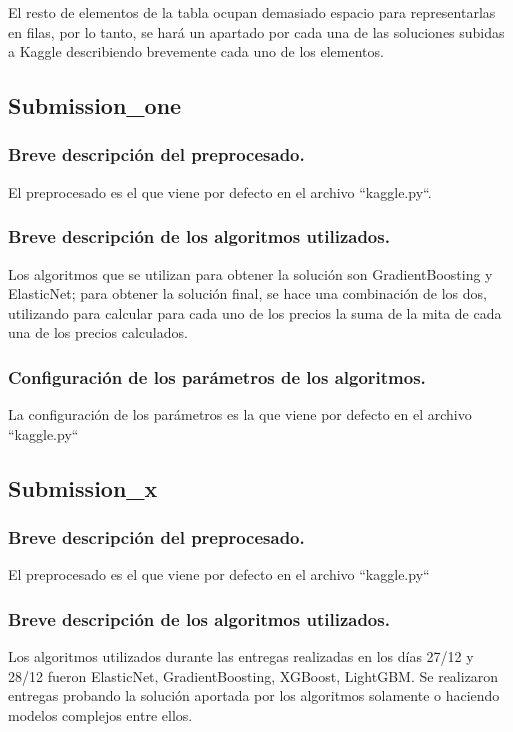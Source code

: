 	\vspace{0.06in}

	El resto de elementos de la tabla ocupan demasiado espacio para representarlas en filas, por lo tanto, se hará un apartado por cada una de las soluciones subidas a Kaggle describiendo brevemente cada uno de los elementos.
	
	\vspace{0.06in}
	
	\subsection{Submission\_one}
	\subsubsection{Breve descripción del preprocesado.}
	El preprocesado es el que viene por defecto en el archivo ``kaggle.py``.
	\subsubsection{Breve descripción de los algoritmos utilizados.}
	Los algoritmos que se utilizan para obtener la solución son GradientBoosting y ElasticNet; para obtener la solución final, se hace una combinación de los dos, utilizando para calcular para cada uno de los precios la suma de la mita de cada una de los precios calculados.
	\subsubsection{Configuración de los parámetros de los algoritmos.}
	La configuración de los parámetros es la que viene por defecto en el archivo ``kaggle.py``
	
	\subsection{Submission\_x}
	\subsubsection{Breve descripción del preprocesado.}
	El preprocesado es el que viene por defecto en el archivo ``kaggle.py``
	\subsubsection{Breve descripción de los algoritmos utilizados.}
	Los algoritmos utilizados durante las entregas realizadas en los días 27/12 y 28/12 fueron ElasticNet, GradientBoosting, XGBoost, LightGBM. Se realizaron entregas probando la solución aportada por los algoritmos solamente o haciendo modelos complejos entre ellos.
